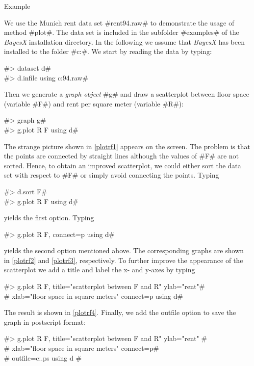 \begin{stanza}{Example}

{We use the Munich rent data set #rent94.raw# to demonstrate the
usage of method #plot#. The data set is included in the subfolder
#examples# of the {\em BayesX} installation directory. In the
following we assume that {\em BayesX} has been installed to the
folder #c:\bayesx#. We start by reading the data by typing:

#> dataset d# \\
#> d.infile using c:\bayesx\examples\rent94.raw#

Then we generate a {\em graph object} #g# and draw a scatterplot
between floor space (variable #F#) and rent per square meter
(variable #R#):

#> graph g# \\
#> g.plot R F using d#

The strange picture shown in \autoref{plotrf1} appears on the
screen. The problem is that the points are connected by straight
lines although the values of #F# are not sorted. Hence, to obtain
an improved scatterplot, we could either sort the data set with
respect to #F# or simply avoid connecting the points. Typing

#> d.sort F# \\
#> g.plot R F using d#

yields the first option. Typing

#> g.plot R F, connect=p using d#

yields the second option mentioned above. The corresponding graphs
are shown in \autoref{plotrf2} and \autoref{plotrf3},
respectively. To further improve the appearance of the scatterplot
we add a title and label the x- and y-axes
by typing

#> g.plot R F, title="scatterplot between F and R" ylab="rent"# \\
#  xlab="floor space in square meters" connect=p using d#

The result is shown in \autoref{plotrf4}.
Finally, we add the outfile option to save the graph in postscript format:

 #> g.plot R F, title="scatterplot between F and R" ylab="rent" #\\
 #  xlab="floor space in square meters" connect=p#\\
 #  outfile=c:\temp\plotrf.ps using d #

}
\end{stanza}

